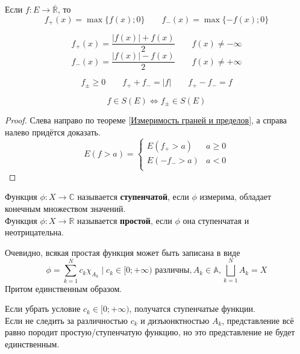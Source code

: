\documentclass{article}
\begin{document}
    \begin{definition}
        Если $f\colon E\to\overline{\mathbb R}$, то
        $$
        f_+(x)=\max\{f(x);0\}\qquad f_-(x)=\max\{-f(x);0\}
        $$
    \end{definition}
    \begin{property}
        $$
        f_+(x)=\frac{|f(x)|+f(x)}2\qquad f(x)\neq-\infty
        $$
        $$
        f_-(x)=\frac{|f(x)|-f(x)}2\qquad f(x)\neq+\infty
        $$
    \end{property}
    \begin{property}
        $$f_\pm\geqslant0\qquad f_++f_-=|f|\qquad f_+-f_-=f$$
    \end{property}
    \begin{property}
        $$f\in S(E)\Leftrightarrow f_\pm\in S(E)$$
    \end{property}
    \begin{proof}
        Слева направо по теореме \ref{Измеримость граней и пределов}, а справа налево придётся доказать.
        $$
        E(f>a)=\begin{cases}
            E(f_+>a) & a\geqslant0\\
            E(-f_->a) & a<0\\
        \end{cases}
        $$
    \end{proof}
    \begin{definition}
        Функция $\phi\colon X\to\mathbb C$ называется \textbf{ступенчатой}, если $\phi$ измерима, обладает конечным множеством значений.\\
        Функция $\phi\colon X\to\mathbb R$ называется \textbf{простой}, если $\phi$ она ступенчатая и неотрицательна.
    \end{definition}
    \begin{property}
        Очевидно, всякая простая функция может быть записана в виде
        $$
        \phi=\sum\limits_{k=1}^Nc_k\chi_{A_k}\mid c_k\in[0;+\infty)\text{ различны},A_k\in\mathbb A,\bigsqcup\limits_{k=1}^NA_k=X
        $$
        Притом единственным образом.
    \end{property}
    \begin{remark}
        Если убрать условие $c_k\in[0;+\infty)$, получатся ступенчатые функции.\\
        Если не следить за различностью $c_k$ и дизъюнктностью $A_k$, представление всё равно породит простую/ступенчатую функцию, но это представление не будет единственным.
    \end{remark}
\end{document}
